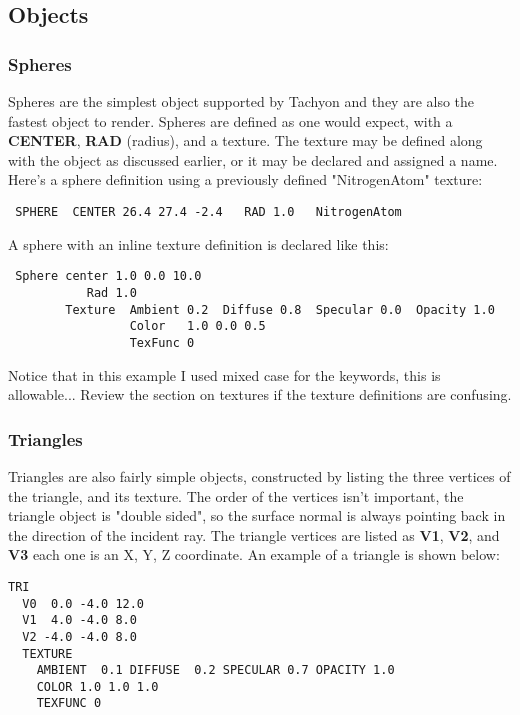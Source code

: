\subsection{Objects}

\subsubsection{Spheres}
  Spheres are the simplest object supported by Tachyon and they are
also the fastest object to render.  Spheres are defined as one would expect,
with a {\bf CENTER}, {\bf RAD} (radius), and a texture.  The texture may
be defined along with the object as discussed earlier, or it may be declared
and assigned a name.  
Here's a sphere definition using a previously defined "NitrogenAtom" texture:
\begin{verbatim}
 SPHERE  CENTER 26.4 27.4 -2.4   RAD 1.0   NitrogenAtom 
\end{verbatim}
A sphere with an inline texture definition is declared like this:
\begin{verbatim}
 Sphere center 1.0 0.0 10.0   
           Rad 1.0
        Texture  Ambient 0.2  Diffuse 0.8  Specular 0.0  Opacity 1.0
                 Color   1.0 0.0 0.5
                 TexFunc 0
\end{verbatim}
Notice that in this example I used mixed case for the keywords, this is
allowable...
Review the section on textures if the texture definitions are confusing.

\subsubsection{Triangles}
  Triangles are also fairly simple objects, constructed by listing the
three vertices of the triangle, and its texture.  The order of the
vertices isn't important, the triangle object is "double sided", so the
surface normal is always pointing back in the direction of the incident ray.
The triangle vertices are listed as {\bf V1}, {\bf V2}, and {\bf V3} each one
is an X, Y, Z coordinate.  An example of a triangle is shown below:
\begin{verbatim}
TRI
  V0  0.0 -4.0 12.0
  V1  4.0 -4.0 8.0
  V2 -4.0 -4.0 8.0
  TEXTURE
    AMBIENT  0.1 DIFFUSE  0.2 SPECULAR 0.7 OPACITY 1.0
    COLOR 1.0 1.0 1.0
    TEXFUNC 0
\end{verbatim}

